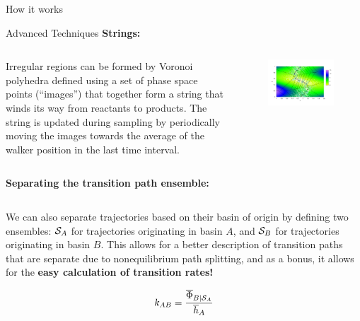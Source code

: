 \documentclass[final]{beamer}
\begin{document}
\begin{columns}[t]
\begin{column}{.33\linewidth}
\begin{block}{How it works}
        \end{block}
	\begin{block}{Advanced Techniques}
	  \textbf{Strings:}

	  \begin{columns}[t]
	    \begin{column}{.65\linewidth}

	  Irregular regions can be formed by Voronoi polyhedra defined using a set of phase space points (``images'') that together form a string that winds its way from reactants to products.
	  The string is updated during sampling by periodically moving the images towards the average of the walker position in the last time interval.

	    \end{column}
	    \begin{column}{.25\linewidth}
	      \begin{figure}
		\includegraphics[width=3 in]{images/whiteandblue.pdf}
	      \end{figure}
	    \end{column}
	  \end{columns}
	  \vspace{30 mm}
	  \textbf{Separating the transition path ensemble:}

	  \begin{columns}[t]
	    \begin{column}{.65\linewidth}

	      We can also separate trajectories based on their basin of origin by defining two ensembles:  ${\cal S}_A$ for trajectories originating in basin $A$, and ${\cal S}_B$ for trajectories originating in basin $B$.
	  This allows for a better description of transition paths that are separate due to nonequilibrium path splitting, and as a bonus, it allows for the \textbf{easy calculation of transition rates!}

	  \begin{equation*}
	    \label{eq:rate}
	    k_{AB} = \frac{\overline{\Phi}_{B \mid {\cal S}_A}}{\overline{h}_A}
	  \end{equation*}


\end{column}
\end{columns}
\end{block}
\end{column}
\end{columns}
\end{document}
